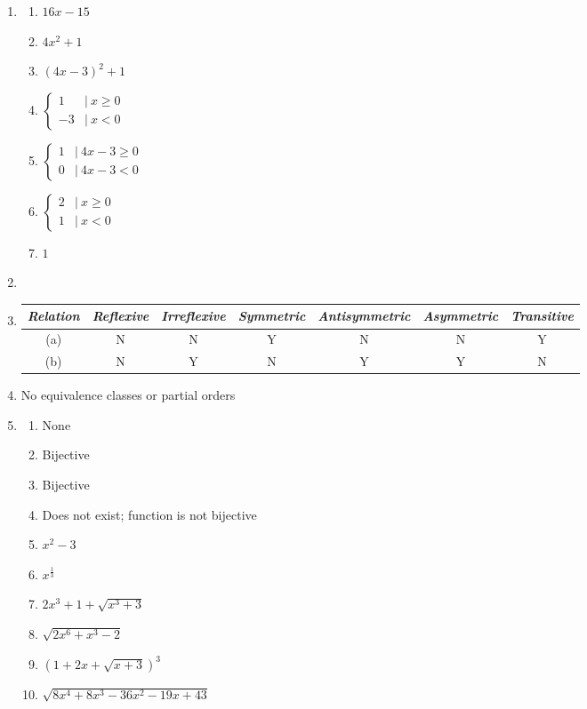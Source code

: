 \begin{enumerate}[leftmargin=2cm,labelsep=.5cm,label=\bf\arabic*.]
\item
\begin{enumerate}
\item $16x-15$
\item $4x^2+1$
\item $\left(4x-3\right)^2+1$
\item $\begin{cases}1 & |\ x \geq 0\\-3 & |\ x < 0\end{cases}$
\item $\begin{cases}1 & |\ 4x-3 \geq 0\\0 & |\ 4x-3 < 0\end{cases}$
\item $\begin{cases}2 & |\ x \geq 0\\1 & |\ x < 0\end{cases}$
\item $1$
\end{enumerate}

\item\adm

\item
\begin{tabu}[t]{|c|c|c|c|c|c|c|}
\hline
\textit{Relation} & \textit{Reflexive} & \textit{Irreflexive} & \textit{Symmetric} & \textit{Antisymmetric} & \textit{Asymmetric} & \textit{Transitive} \\ \hline
(a) & N & N & Y & N & N & Y \\ \hline
(b) & N & Y & N & Y & Y & N \\ \hline
\end{tabu}

\item No equivalence classes or partial orders

\item
\begin{enumerate}
\item None
\item Bijective
\item Bijective
\item Does not exist; function is not bijective
\item $x^2-3$
\item $x^{\frac{1}{3}}$
\item $2x^3+1+\sqrt{x^3+3}$
\item $\sqrt{2x^6+x^3-2}$
\item $\left(1+2x+\sqrt{x+3}\right)^3$
\item $\sqrt{8x^4+8x^3-36x^2-19x+43}$
\end{enumerate}
\end{enumerate}
